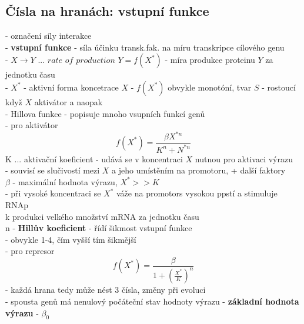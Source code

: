 \documentclass[11pt,a4paper]{report}
\begin{document}
\subsection{Čísla na hranách: vstupní funkce}
- označení síly interakce\\
- \textbf{vstupní funkce} - síla účinku transk.fak. na míru transkripce cílového genu\\
- $X\rightarrow Y$ ... $rate$ $of$ $production$ $Y=f(X^*)$ - míra produkce proteinu $Y$ za jednotku času\\
\indent - $X^*$ - aktivní forma koncetrace $X$
\indent - $f(X^*)$ obvykle monotóní, tvar $S$ - rostoucí když $X$ aktivátor a naopak\\
- Hillova funkce - popisuje mnoho vsupních funkcí genů\\
\indent - pro aktivátor\\
\begin{equation}
	f(X^*)=\frac{\beta X^{*n}}{K^n+N^{*n}}
\end{equation}
\indent \indent K ... aktivační koeficient - udává se v koncentraci $X$ nutnou pro aktivaci výrazu\\
\indent \indent \indent - souvisí se slučivostí mezi $X$ a jeho umístěním na promotoru, + další faktory\\
\indent \indent $\beta$ - maximální hodnota výrazu, $X^*>>K$\\
\indent \indent \indent - při vysoké koncentraci se $X^*$ váže na promotors vysokou ppstí a stimuluje RNAp\\
\indent \indent \indent k produkci velkého množství mRNA za jednotku času\\
\indent \indent n - \textbf{Hillův koeficient} - řídí šikmost vstupní funkce\\
\indent \indent \indent - obvykle 1-4, čím vyšší tím šikmější\\
\indent - pro represor
\begin{equation}
	f(X^*)=\frac{\beta}{1+(\frac{X^*}{K})^n}
\end{equation}
- každá hrana tedy může nést 3 čísla, změny při evoluci\\
- spousta genů má nenulový počáteční stav hodnoty výrazu - \textbf{základní hodnota výrazu} - $\beta_0$\\
\end{document}
